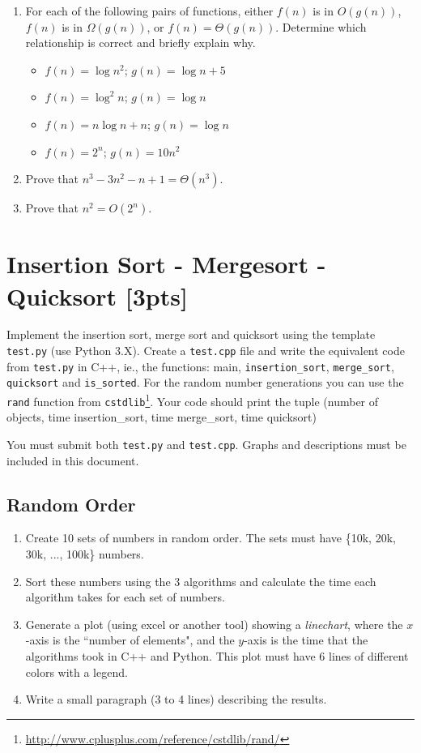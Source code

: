 \documentclass{article}
\begin{document}
\begin{enumerate}[label=\Alph*]
  \item For each of the following pairs of functions, either $f(n)$ is in $O(g(n))$, $f(n)$ is in $\Omega(g(n))$, or $f(n) = \Theta(g(n))$. Determine which relationship is correct and briefly explain why.
    \begin{itemize}
      \item $f(n) = \log n^2$; $g(n) = \log n + 5$
      \item $f(n) = \log^2 n$; $g(n) = \log n$
      \item $f(n) = n\log n + n$; $g(n) = \log n$
      \item $f(n) = 2^n$; $g(n) = 10n^2$
    \end{itemize}
  
  \item Prove that $n^3 -3n^2 -n+1 = \Theta(n^3)$.
  \item Prove that $n^2 = O(2^n)$.
  
\end{enumerate}


\section{Insertion Sort - Mergesort - Quicksort [3pts]}
Implement the insertion sort, merge sort and quicksort using the template \texttt{test.py} (use Python 3.X). Create a \texttt{test.cpp} file and write the equivalent code from \texttt{test.py} in C++, ie., the functions: main, \texttt{insertion\_sort}, \texttt{merge\_sort}, \texttt{quicksort} and \texttt{is\_sorted}. For the random number generations you can use the \texttt{rand} function from \texttt{cstdlib}\footnote{\url{http://www.cplusplus.com/reference/cstdlib/rand/}}. Your code should print the tuple (number of objects, time insertion\_sort, time merge\_sort, time quicksort)

You must submit both \texttt{test.py} and \texttt{test.cpp}. Graphs and descriptions must be included in this document. 

\subsection{Random Order}
\begin{enumerate}
  \item Create 10 sets of numbers in random order. The sets must have \{10k, 20k, 30k, ..., 100k\} numbers.
  
  \item Sort these numbers using the 3 algorithms and calculate the time each algorithm takes for each set of numbers.
  
  \item Generate a plot (using excel or another tool) showing a \emph{linechart}, where the $x$-axis is the ``number of elements", and the $y$-axis is the time that the algorithms took in C++ and Python. This plot must have 6 lines of different colors with a legend.
  
  \item Write a small paragraph (3 to 4 lines) describing the results.
\end{enumerate}
\end{document}
